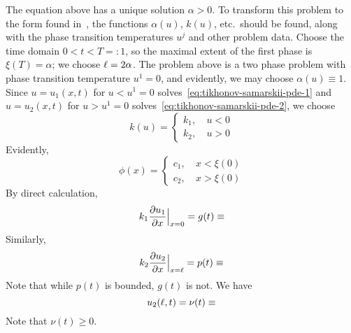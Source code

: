 The equation above has a unique solution \(\alpha>0\).
To transform this problem to the form found in~\cite{abdulla16a}, the functions
\(\alpha(u)\), \(k(u)\), etc.\ should be found, along with the phase transition
temperatures \(u^j\) and other problem data.
Choose the time domain \(0<t<T=: 1\), so the maximal extent of the first phase is \(\xi(T) = \alpha\); we choose \(\ell = 2\alpha{}\).
The problem above is a two phase problem with phase transition temperature \(u^1
= 0\), and evidently, we may choose \(\alpha(u)\equiv 1\).
Since \(u=u_1(x,t)\) for \(u<u^1=0\) solves~\eqref{eq:tikhonov-samarskii-pde-1}
and \(u=u_2(x,t)\) for \(u>u^1=0\) solves~\eqref{eq:tikhonov-samarskii-pde-2},
we choose
\[
  k(u) =
  \begin{cases}
    k_1,~&u<0
    \\
    k_2,~&u>0
  \end{cases}
\]
%
Evidently,
\[
  \phi(x) =
  \begin{cases}
    c_1,~&x<\xi(0)
    \\
    c_2,~&x>\xi(0)
  \end{cases}
\]
%
By direct calculation,
\[
  k_1 \frac{\partial{} u_1}{\partial{} x} \Big\vert_{x=0}
  = g(t) \equiv
\]
Similarly,
\[
  k_2 \frac{\partial{} u_2}{\partial{} x} \Big \vert_{x=\ell}
  = p(t) \equiv
\]
Note that while \(p(t)\) is bounded, \(g(t)\) is not.
%
We have
\[
  u_2(\l, t)
  = \nu(t)
  \equiv %
\]
Note that \(\nu(t)\geq 0\).

